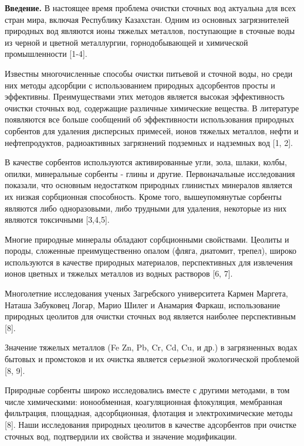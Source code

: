 \begin{multicols}{2}
{\bfseries Введение.} В настоящее время проблема очистки сточных вод
актуальна для всех стран мира, включая Республику Казахстан. Одним из
основных загрязнителей природных вод являются ионы тяжелых металлов,
поступающие в сточные воды из черной и цветной металлургии,
горнодобывающей и химической промышленности {[}1-4{]}.

Известны многочисленные способы очистки питьевой и сточной воды, но
среди них методы адсорбции с использованием природных адсорбентов просты
и эффективны. Преимуществами этих методов является высокая эффективность
очистки сточных вод, содержащие различные химические вещества. В
литературе появляются все больше сообщений об эффективности
использования природных сорбентов для удаления дисперсных примесей,
ионов тяжелых металлов, нефти и нефтепродуктов, радиоактивных
загрязнений подземных и надземных вод {[}1, 2{]}.

В качестве сорбентов используются активированные угли, зола, шлаки,
колбы, опилки, минеральные сорбенты - глины и другие. Первоначальные
исследования показали, что основным недостатком природных глинистых
минералов является их низкая сорбционная способность. Кроме того,
вышеупомянутые сорбенты являются либо одноразовыми, либо трудными для
удаления, некоторые из них являются токсичными {[}3,4,5{]}.

Многие природные минералы обладают сорбционными свойствами. Цеолиты и
породы, сложенные преимущественно опалом (фляга, диатомит, трепел),
широко используются в качестве природных материалов, перспективных для
извлечения ионов цветных и тяжелых металлов из водных растворов {[}6,
7{]}.

Многолетние исследования ученых Загребского университета Кармен Маргета,
Наташа Забуковец Логар, Марио Шилег и Анамария Фаркаш, использование
природных цеолитов для очистки сточных вод является наиболее
перспективным {[}8{]}.

Значение тяжелых металлов (Fe Zn, Pb, Cr, Cd, Cu, и др.) в загрязненных
водах бытовых и промстоков и их очистка является серьезной экологической
проблемой {[}8, 9{]}.

Природные сорбенты широко исследовались вместе с другими методами, в том
числе химическими: ионообменная, коагуляционная флокуляция, мембранная
фильтрация, площадная, адсорбционная, флотация и электрохимические
методы {[}8{]}. Наши исследования природных цеолитов в качестве
адсорбентов при очистке сточных вод, подтвердили их свойства и значение
модификации.


\end{multicols}
